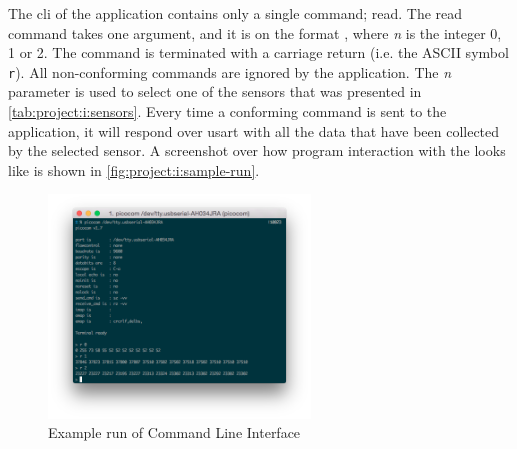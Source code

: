 The \gls{cli} of the application contains only a single command; read.
The read command takes one argument, and it is on the format , where \emph{n} is the integer 0, 1 or 2.
The command is terminated with a carriage return (i.e. the ASCII symbol \texttt{{}r}).
All non-conforming commands are ignored by the application.
The \emph{n} parameter is used to select one of the sensors that was presented in \autoref{tab:project:i:sensors}.
Every time a conforming command is sent to the application, it will respond over \gls{usart} with all the data that have been collected by the selected sensor.
A screenshot over how program interaction with the {\tracker} looks like is shown in \autoref{fig:project:i:sample-run}.

\begin{figure}[H]
  \begin{center}
    \includegraphics[width=0.62\textwidth]{figures/sensortracker-cli}
  \end{center}
  \caption{Example run of Command Line Interface}
  \label{fig:project:i:sample-run}
\end{figure}
